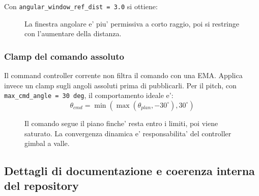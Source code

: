 \documentclass[11pt,a4paper]{article}
\newcommand{\code}[1]{\texttt{#1}}
\begin{document}
Con \code{angular\_window\_ref\_dist = 3.0} si ottiene:

\begin{figure}[ht]
\centering
{}
\caption{La finestra angolare e' piu' permissiva a corto raggio, poi si restringe con l'aumentare della distanza.}
\end{figure}

\subsubsection{Clamp del comando assoluto}

Il command controller corrente non filtra il comando con una EMA. Applica invece un clamp sugli angoli assoluti prima di pubblicarli. Per il pitch, con \code{max\_cmd\_angle = 30 deg}, il comportamento ideale e':
\begin{equation}
  \theta_{cmd} = \min(\max(\theta_{plan}, -30^\circ), 30^\circ)
\end{equation}

\begin{figure}[ht]
\centering
{}
\caption{Il comando segue il piano finche' resta entro i limiti, poi viene saturato. La convergenza dinamica e' responsabilita' del controller gimbal a valle.}
\end{figure}

\subsection{Dettagli di documentazione e coerenza interna del repository}
\end{document}
